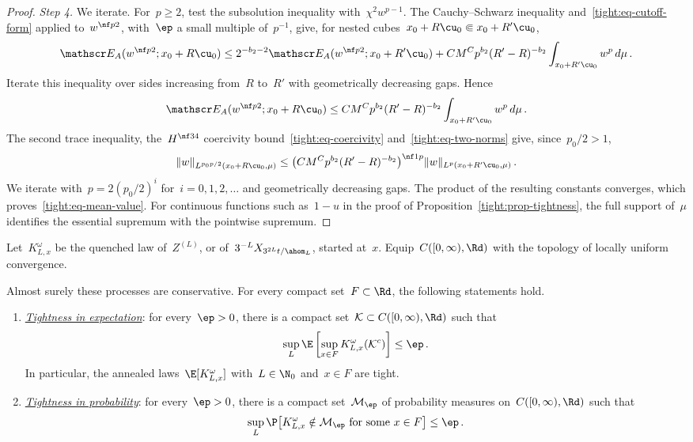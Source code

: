 \documentclass[11pt]{amsart}
\begin{document}
\begin{proof}
\emph{Step 4.} We iterate. For~$p\geq2$, test the subsolution inequality with~$\chi^2w^{p-1}$. The Cauchy--Schwarz inequality and~\eqref{tight:eq-cutoff-form} applied to~$w^{\nf p2}$, with~$\ep$ a small multiple of~$p^{-1}$, give, for nested cubes~$x_0+R\cu_0\Subset x_0+R'\cu_0$,
\begin{equation*}
	\mathscr E_A(w^{\nf p2};x_0+R\cu_0)
	\leq2^{-b_2-2}\mathscr E_A(w^{\nf p2};x_0+R'\cu_0)
	+CM^Cp^{b_2}(R'-R)^{-b_2}\int_{x_0+R'\cu_0}w^p\,d\mu\,.
\end{equation*}
Iterate this inequality over sides increasing from~$R$ to~$R'$ with geometrically decreasing gaps. Hence
\begin{equation*}
	\mathscr E_A(w^{\nf p2};x_0+R\cu_0)
	\leq CM^Cp^{b_2}(R'-R)^{-b_2}\int_{x_0+R'\cu_0}w^p\,d\mu\,.
\end{equation*}
The second trace inequality, the~$H^{\nf34}$ coercivity bound~\eqref{tight:eq-coercivity} and~\eqref{tight:eq-two-norms} give, since~$p_0/2>1$,
\begin{equation*}
	\|w\|_{L^{p_0p/2}(x_0+R\cu_0,\mu)}
	\leq\bigl(CM^Cp^{b_2}(R'-R)^{-b_2}\bigr)^{\nf1p}
	\|w\|_{L^p(x_0+R'\cu_0,\mu)}\,.
\end{equation*}
We iterate with~$p=2(p_0/2)^i$ for~$i=0,1,2,\ldots$ and geometrically decreasing gaps. The product of the resulting constants converges, which proves~\eqref{tight:eq-mean-value}. For continuous functions such as~$1-u$ in the proof of Proposition~\ref{tight:prop-tightness}, the full support of~$\mu$ identifies the essential supremum with the pointwise supremum.
\end{proof}

Let~$K^\omega_{L,x}$ be the quenched law of~$Z^{(L)}$, or of~$3^{-L}X_{3^{2L}t/\ahom_L}$, started at~$x$. Equip~$C([0,\infty),\Rd)$ with the topology of locally uniform convergence.

\begin{proposition}[Tightness]
\label{tight:prop-tightness}
Almost surely these processes are conservative. For every compact set~$F\subset\Rd$, the following statements hold.
\begin{enumerate}[label=(\roman*)]
\item \underline{\emph{Tightness in expectation}}: for every~$\ep>0$, there is a compact set~$\mathcal K\subset C([0,\infty),\Rd)$ such that
\begin{equation}
	\sup_L\E\left[\sup_{x\in F}K^\omega_{L,x}(\mathcal K^c)\right]
	\leq\ep\,.
	\label{tight:eq-uniform-laws}
\end{equation}
In particular, the annealed laws~$\E[K^\omega_{L,x}]$ with~$L\in\N_0$ and~$x\in F$ are tight.

\item \underline{\emph{Tightness in probability}}: for every~$\ep>0$, there is a compact set~$\mathcal M_\ep$ of probability measures on~$C([0,\infty),\Rd)$ such that
\begin{equation}
	\sup_L\P\bigl[K^\omega_{L,x}\notin\mathcal M_\ep\ \text{for some}\ x\in F\bigr]
	\leq\ep\,.
	\label{tight:eq-random-laws}
\end{equation}
\end{enumerate}
\end{proposition}
\end{document}
